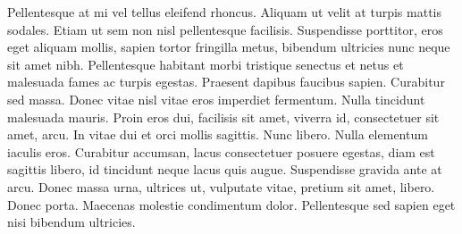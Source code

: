Pellentesque at mi vel tellus eleifend rhoncus. Aliquam ut velit at turpis mattis sodales. Etiam ut sem non nisl pellentesque facilisis. Suspendisse porttitor, eros eget aliquam mollis, sapien tortor fringilla metus, bibendum ultricies nunc neque sit amet nibh. Pellentesque habitant morbi tristique senectus et netus et malesuada fames ac turpis egestas. Praesent dapibus faucibus sapien. Curabitur sed massa. Donec vitae nisl vitae eros imperdiet fermentum. Nulla tincidunt malesuada mauris. Proin eros dui, facilisis sit amet, viverra id, consectetuer sit amet, arcu. In vitae dui et orci mollis sagittis. Nunc libero. Nulla elementum iaculis eros. Curabitur accumsan, lacus consectetuer posuere egestas, diam est sagittis libero, id tincidunt neque lacus quis augue. Suspendisse gravida ante at arcu. Donec massa urna, ultrices ut, vulputate vitae, pretium sit amet, libero. Donec porta. Maecenas molestie condimentum dolor. Pellentesque sed sapien eget nisi bibendum ultricies.